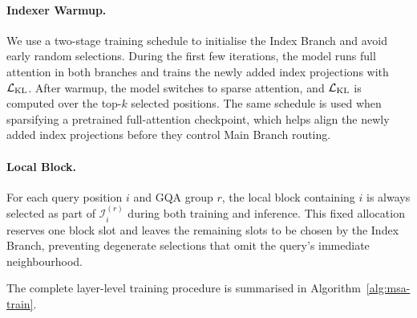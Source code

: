 \documentclass{llmxive}
\makeatletter
\providecommand{\bm}[1]{\boldsymbol{#1}}
\providecommand{\Ls}{\mathcal{L}}
\providecommand{\R}{\mathbb{R}}
\providecommand{\method}{\textsc{MSA}}
\providecommand{\sg}{\mathrm{stopgrad}}
\providecommand{\algorithmiccomment}[1]{\hfill// #1}
\providecommand{\Algref}[1]{Algorithm~\ref{#1}}
\providecommand{\mK}{{\bm{K}}}
\providecommand{\mO}{{\bm{O}}}
\providecommand{\mQ}{{\bm{Q}}}
\providecommand{\mV}{{\bm{V}}}
\providecommand{\mW}{{\bm{W}}}
\providecommand{\mX}{{\bm{X}}}
\providecommand{\gI}{{\mathcal{I}}}
\providecommand{\REQUIRE}{\item[\algorithmicrequire]}
\providecommand{\STATE}{\ALC@it}
\providecommand{\COMMENT}[1]{\algorithmiccomment{##1}}
\makeatother
\begin{document}
\paragraph{Indexer Warmup.} We use a two-stage training schedule to initialise the Index Branch and avoid early random selections. During the first few iterations, the model runs full attention in both branches and trains the newly added index projections with $\Ls_{\rm KL}$. After warmup, the model switches to sparse attention, and $\Ls_{\rm KL}$ is computed over the top-$k$ selected positions. The same schedule is used when sparsifying a pretrained full-attention checkpoint, which helps align the newly added index projections before they control Main Branch routing.


\paragraph{Local Block.} For each query position $i$ and GQA group $r$, the local block containing $i$ is always selected as part of $\gI_i^{(r)}$ during both training and inference. This fixed allocation reserves one block slot and leaves the remaining slots to be chosen by the Index Branch, preventing degenerate selections that omit the query's immediate neighbourhood.



The complete layer-level training procedure is summarised in \Algref{alg:msa-train}.

\begin{algorithm}[t]
\caption{One \method{} layer: training forward and the auxiliary KL loss. The layer returns its output and per-layer $\Ls_{\rm KL}$; the model loss $\Ls = \Ls_{\rm LM} + \lambda\sum_{\rm layers}\Ls_{\rm KL}$ is assembled by the training loop.}
\label{alg:msa-train}
\end{algorithm}
\end{document}
